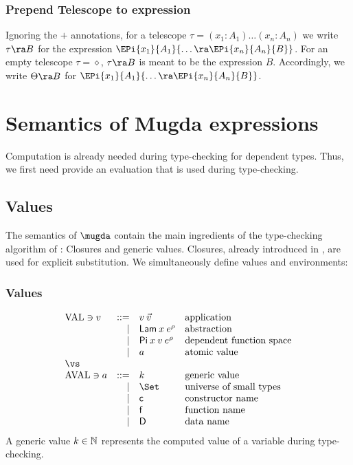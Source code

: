 \subsubsection{Prepend Telescope to expression}
Ignoring the $+$ annotations, for a telescope $\tau = (x_1 : A_1) \ldots (x_n : A_n)$ we write $\tau \ra B$ for the expression $\EPi{x_1}{A_1}{\ldots \ra \EPi{x_n}{A_n}{B}}$.
For an empty telescope $\tau = \diamond$, $\tau \ra B$ is meant to be the expression $B$.
Accordingly, we write $\Theta \ra B$ for $\EPi{x_1}{A_1}{\ldots \ra \EPi{x_n}{A_n}{B}}$.


\section{Semantics of Mugda expressions}
Computation is already needed during type-checking for dependent types.
Thus, we first need provide an evaluation that is used during type-checking.

\subsection{Values}

The semantics of $\mugda$ contain the main ingredients of the type-checking algorithm of \cite{coquand96algorithm}: Closures and generic values.
Closures, already introduced in \cite{Landin63}, are used for explicit substitution.
We simultaneously define values and environments:

\subsubsection{Values}
\[
\begin{array}{lrll}
\Val \ni v & ::= & v \: \vec{v} & \mbox{application}\\
& \mid & \vlam \: x \: \cl{e}{\rho} & \mbox{abstraction}\\
& \mid & \vpi \: x \: v \: \cl{e}{\rho} & \mbox{dependent function space}\\
& \mid & a & \mbox{atomic value}\\
\vs\\
\AVal \ni a & ::= & k & \mbox{generic value}\\
& \mid & \Set & \mbox{universe of small types} \\
& \mid & \cc & \mbox{constructor name}\\
& \mid & \ff & \mbox{function name}\\
& \mid & \DD & \mbox{data name}\\
\end{array}
\]
A generic value $k \in \mathbb{N}$ represents the computed value of a variable during type-checking.

